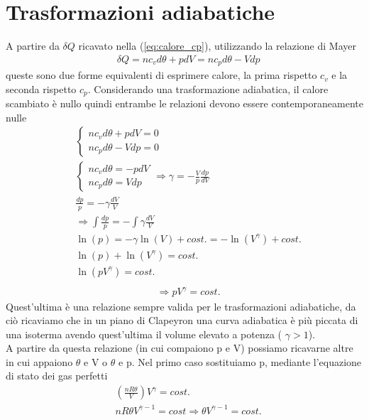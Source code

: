 \documentclass[10pt,a4paper]{article}
\begin{document}
\section{Trasformazioni adiabatiche}\label{sec:trasformazioni_adiabatiche}
A partire da $\delta Q$ ricavato nella (\ref{eq:calore_cp}), utilizzando la relazione di Mayer 
\begin{align*}
	&\delta Q = n c_v d\theta + pdV = n c_p d\theta - Vdp 
	\end{align*}
	queste sono due forme equivalenti di esprimere calore, la prima rispetto \(c_v\) e la seconda rispetto \(c_p\). Considerando una trasformazione adiabatica, il calore scambiato è nullo quindi entrambe le relazioni devono essere contemporaneamente nulle
	\begin{align*}
	&\begin{cases}
		n c_v d\theta +pdV=0\\
		n c_p d\theta - V dp=0
	\end{cases}\\
	&\begin{cases}
	n c_v d\theta =-pdV\\
	n c_p d\theta = V dp
	\end{cases} \Rightarrow \gamma = - \frac{V}{p}\frac{dp}{dV}\\
	& \frac{dp}{p} = -\gamma \frac{dV}{V} \\
	&\Rightarrow \int\frac{dp}{p} = -\int\gamma \frac{dV}{V}\\
	&\ln(p) = -\gamma \ln(V) + cost. = -\ln(V^{\gamma}) + cost.\\
	&\ln(p)+\ln(V^{\gamma}) = cost.\\
	&\ln(pV^{\gamma}) = cost.\\
\end{align*}
\begin{align}\label{eq:adiabatica1}
	&\Rightarrow pV^{\gamma} = cost.
\end{align}
Quest'ultima è una relazione sempre valida per le trasformazioni adiabatiche, da ciò ricaviamo che in un piano di Clapeyron una curva adiabatica è più piccata di una isoterma avendo quest'ultima il volume elevato a potenza ( \(\gamma > 1\)).\\
A partire da questa relazione (in cui compaiono p e V) possiamo ricavarne altre in cui appaiono \(\theta\) e V o \(\theta\) e p. Nel primo caso sostituiamo p, mediante l'equazione di stato dei gas perfetti
\begin{align}\label{eq:adiabatica2}
	&\left(\frac{n R \theta}{V}\right)V^{\gamma} = cost.\nonumber\\
	&n R \theta V^{\gamma - 1} = cost \Rightarrow \theta V ^{\gamma-1}= cost.
\end{align}
\end{document}

